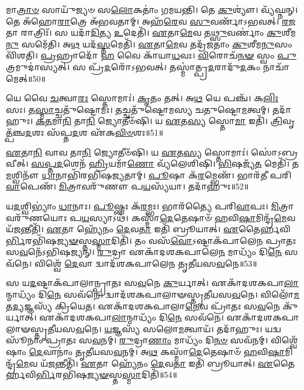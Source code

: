 𑌮𑌾\-\ul{𑌤𑍍𑌰𑌾}\-\-\ul{𑍞} 𑌸𑌾𑌯𑍁᳴𑌜𑍍𑌯𑍞 𑌸\-\ul{𑌲𑍋}\-𑌕𑌤𑌾𑌂॑ 𑌗𑌮𑌯𑌨𑍍𑌤𑌿।
𑌤𑍇 \ul{𑌕𑍁}\-𑌶𑍍𑌯𑍗॑।
𑌵𑍍𑌯᳴𑌘𑍍𑌨𑌨𑍍।
𑌤𑍇 𑌅᳴𑌹𑍋\-\ul{𑌰𑌾}\-𑌤𑍍𑌰𑍇 𑌅᳴𑌭𑌵𑌤𑌾𑌮𑍍।
𑌅𑌹᳴\-\ul{𑌰𑍇}\-𑌵 \ul{𑌸𑍁}\-𑌵𑌰𑍍𑌣𑌾᳴\-𑌽𑌭𑌵𑌤𑍍।
\-\ul{𑌰}\-\-\ul{𑌜}\-𑌤𑌾 𑌰𑌾𑌤𑍍𑌰𑌿𑌃᳴।
𑌸 𑌯𑌦𑌾᳴\-\ul{𑌦𑌿}\-𑌤𑍍𑌯 \ul{𑌉}\-𑌦𑍇𑌤𑌿᳴।
\-\ul{𑌏}\-𑌤𑌾\-\ul{𑌮𑍇}\-𑌵 𑌤\-\ul{𑌥𑍍𑌸𑍁}\-𑌵𑌰𑍍𑌣𑌾𑌂॑ \ul{𑌕𑍁}\-𑌶𑍀𑌮\-\ul{𑌨𑍁} 𑌸𑌮𑍇᳴𑌤𑌿।
𑌅\-\ul{𑌥} 𑌯𑌦᳴\-\ul{𑌸𑍍𑌤}\-𑌮𑍇𑌤𑌿᳴।
\-\ul{𑌏}\-𑌤𑌾\-\ul{𑌮𑍇}\-𑌵 𑌤𑌦𑍍𑌰᳴\-\ul{𑌜}\-𑌤𑌾𑌂 \ul{𑌕𑍁}\-𑌶𑍀𑌮\-\ul{𑌨𑍁}\-𑌸𑌂𑌵𑌿᳴𑌶𑌤𑌿।
\-\ul{𑌪𑍍𑌰}\-𑌹𑍍𑌰𑌾𑌦𑍋᳴ \ul{𑌹} 𑌵𑍈 𑌕𑌾᳴𑌯𑌾\-\ul{𑌧}\-𑌵𑌃।
\-\ul{𑌵𑌿}\-𑌰𑍋𑌚᳴\-\ul{𑌨}\-\-\ul{𑍟} 𑌸𑍍𑌵𑌂 \ul{𑌪𑍁}\-𑌤𑍍𑌰𑌮𑍁𑌦𑌾॑𑌸𑍍𑌯𑌤𑍍।
𑌸 𑌪𑍍𑌰᳴\-\ul{𑌦}\-𑌰𑍋᳴\-𑌽𑌭𑌵𑌤𑍍।
𑌤𑌸𑍍𑌮𑌾॑𑌤𑍍𑌪𑍍𑌰\-\ul{𑌦}\-𑌰𑌾𑌦𑍁᳴\-\ul{𑌦}\-𑌕𑌂 𑌨𑌾𑌚𑌾᳴𑌮𑍇𑌤𑍍॥50॥\anuvakamend[\-\ul{𑌆}\-\-\ul{𑌦𑌿}\-𑌤𑍍𑌯𑌃 𑌪᳴𑌞𑍍𑌚\-\ul{𑌦}\-𑌶\-\ul{𑌸𑍍𑌯} 𑌮𑌾𑌤𑍍𑌰𑌾॑ \ul{𑌸𑍍𑌤𑍁}\-𑌵𑌤𑍇᳴ 𑌪𑌞𑍍𑌚\-\ul{𑌦}\-𑌶𑍇\-\ul{𑌨𑍈}\-𑌵 𑌤𑌦𑍍𑌯𑌜᳴𑌮𑌾\-\ul{𑌨}\-𑌮𑌾𑌦᳴𑌦𑌤𑍇 𑌸𑌪𑍍𑌤\-\ul{𑌦}\-𑌶𑍇\-\ul{𑌨𑍈}\-𑌵 𑌹᳴𑌰𑌨𑍍𑌤𑍍𑌯𑌾\-\ul{𑌦𑌿}\-𑌤𑍍𑌯\-\ul{𑌸𑍍𑌯𑍈}\-𑌵𑍈\-\ul{𑌨𑌂} 𑌤𑌦𑍍𑌵𑌿᳴𑌶𑌤𑌿 \ul{𑌚}\-𑌤𑍍𑌵𑌾𑌰𑌿᳴ 𑌚]

𑌯𑍇 𑌵𑍈 \ul{𑌚}\-𑌤𑍍𑌵𑌾\-\ul{𑌰𑌃} 𑌸𑍍𑌤𑍋𑌮𑌾𑌃॑।
\-\ul{𑌕𑍃}\-𑌤𑌂 𑌤𑌤𑍍।
𑌅\-\ul{𑌥} 𑌯𑍇 𑌪𑌞𑍍𑌚᳴।
𑌕\-\ul{𑌲𑌿𑌃} 𑌸𑌃।
𑌤\-\ul{𑌸𑍍𑌮𑌾}\-𑌚𑍍𑌚𑌤𑍁᳴𑌷𑍍𑌟𑍋𑌮𑌃।
𑌤𑌚𑍍𑌚𑌤𑍁᳴𑌷𑍍𑌟𑍋𑌮𑌸𑍍𑌯 𑌚𑌤𑍁𑌷𑍍𑌟𑍋\-\ul{𑌮}\-𑌤𑍍𑌵𑌮𑍍।
𑌤𑌦𑌾᳴𑌹𑍁𑌃।
\-\ul{𑌕}\-\-\ul{𑌤}\-𑌮𑌾\-\ul{𑌨𑌿} 𑌤𑌾\-\ul{𑌨𑌿} 𑌜𑍍𑌯𑍋𑌤𑍀𑍞᳴𑌷𑌿।
𑌯 \ul{𑌏}\-𑌤\-\ul{𑌸𑍍𑌯} 𑌸𑍍𑌤𑍋\-\ul{𑌮𑌾} 𑌇𑌤𑌿᳴।
\-\ul{𑌤𑍍𑌰𑌿}\-𑌵𑍃𑌤𑍍𑌪᳴𑌞𑍍𑌚\-\ul{𑌦}\-𑌶𑌃 𑌸᳴𑌪𑍍𑌤\-\ul{𑌦}\-𑌶 𑌏᳴𑌕\-\ul{𑌵𑌿}\-\-\ul{𑍞}\-𑌶𑌃॥51॥

\-\ul{𑌏}\-𑌤𑌾\-\ul{𑌨𑌿} 𑌵𑌾𑌵 𑌤𑌾\-\ul{𑌨𑌿} 𑌜𑍍𑌯𑍋𑌤𑍀𑍞᳴𑌷𑌿।
𑌯 \ul{𑌏}\-𑌤\-\ul{𑌸𑍍𑌯} 𑌸𑍍𑌤𑍋𑌮𑌾𑌃॑।
𑌸𑍋॑𑌽𑌬𑍍𑌰𑌵𑍀𑌤𑍍।
\-\ul{𑌸}\-\-\ul{𑌪𑍍𑌤}\-\-\ul{𑌦}\-𑌶𑍇𑌨᳴ \ul{𑌹𑍍𑌰𑌿}\-𑌯𑌮𑌾᳴\-\ul{𑌣𑍋} 𑌵𑍍𑌯᳴𑌲𑍇𑌶𑌿𑌷𑌿।
\-\ul{𑌭𑌿}\-𑌷𑌜𑍍𑌯᳴\-\ul{𑌤} 𑌮𑍇𑌤𑌿᳴।
𑌤\-\ul{𑌮}\-𑌶𑍍𑌵𑌿𑌨𑍗᳴ \ul{𑌧𑌾}\-𑌨𑌾𑌭𑌿᳴𑌰𑌭𑌿𑌷𑌜𑍍𑌯𑌤𑌾𑌮𑍍।
\-\ul{𑌪𑍂}\-𑌷𑌾 𑌕᳴\-\ul{𑌰}\-𑌮𑍍𑌭𑍇𑌣᳴।
𑌭𑌾𑌰᳴𑌤𑍀 𑌪𑌰𑌿\-\ul{𑌵𑌾}\-𑌪𑍇𑌣᳴।
\-\ul{𑌮𑌿}\-𑌤𑍍𑌰𑌾𑌵𑌰𑍁᳴𑌣𑍗 𑌪\-\ul{𑌯}\-𑌸𑍍𑌯᳴𑌯𑌾।
𑌤𑌦𑌾᳴𑌹𑍁𑌃॥52॥

𑌯\-\ul{𑌦}\-𑌶𑍍𑌵𑌿𑌭𑍍𑌯𑌾𑌂॑ \ul{𑌧𑌾}\-𑌨𑌾𑌃।
\-\ul{𑌪𑍂}\-𑌷𑍍𑌣𑌃 𑌕᳴\-\ul{𑌰}\-𑌮𑍍𑌭𑌃।
𑌭𑌾𑌰᳴𑌤𑍍𑌯𑍈 𑌪𑌰𑌿\-\ul{𑌵𑌾}\-𑌪𑌃।
\-\ul{𑌮𑌿}\-𑌤𑍍𑌰𑌾𑌵𑌰𑍁᳴𑌣𑌯𑍋𑌃 𑌪\-\ul{𑌯}\-𑌸𑍍𑌯𑌾𑌽𑌥᳴।
𑌕𑌸𑍍𑌮𑌾᳴\-\ul{𑌦𑍇}\-𑌤𑍇𑌷𑌾𑍞᳴ \ul{𑌹}\-𑌵𑌿\-\ul{𑌷𑌾}\-𑌮𑌿𑌨𑍍𑌦𑍍𑌰᳴\-\ul{𑌮𑍇}\-𑌵 𑌯᳴\-\ul{𑌜}\-𑌨𑍍𑌤𑍀𑌤𑌿᳴।
\-\ul{𑌏}\-𑌤𑌾 𑌹𑍍𑌯𑍇᳴𑌨𑌂 \ul{𑌦𑍇}\-𑌵\-\ul{𑌤𑌾} 𑌇𑌤𑌿᳴ 𑌬𑍍𑌰𑍂𑌯𑌾𑌤𑍍।
\-\ul{𑌏}\-𑌤𑍈𑌰𑍍\mbox{}\-\ul{𑌹}\-𑌵𑌿\-\ul{𑌰𑍍𑌭𑌿}\-\-𑌰𑌭𑌿᳴𑌷\-\ul{𑌜𑍍𑌯}\-\-\ul{𑍟}\-𑌸𑍍𑌤\-\ul{𑌸𑍍𑌮𑌾}\-𑌦𑌿𑌤𑌿᳴।
𑌤𑌂 𑌵𑌸᳴\-\ul{𑌵𑍋}\-\-𑌽𑌷𑍍𑌟𑌾\-𑌕᳴𑌪𑌾𑌲𑍇𑌨 𑌪𑍍𑌰𑌾𑌤𑌃 𑌸\-\ul{𑌵}\-𑌨𑍇᳴\-𑌽𑌭𑌿𑌷𑌜𑍍𑌯𑌨𑍍।
\-\ul{𑌰𑍁}\-𑌦𑍍𑌰𑌾 𑌏𑌕𑌾᳴\-𑌦𑌶\-𑌕𑌪𑌾𑌲𑍇\-\ul{𑌨} 𑌮𑌾𑌧𑍍𑌯𑌂᳴ 𑌦𑌿\-\ul{𑌨𑍇} 𑌸𑌵᳴𑌨𑍇।
𑌵𑌿𑌶𑍍𑌵𑍇᳴ \ul{𑌦𑍇}\-𑌵𑌾 𑌦𑍍𑌵𑌾𑌦᳴𑌶𑌕𑌪𑌾𑌲𑍇𑌨 𑌤𑍃𑌤𑍀𑌯𑌸\-\ul{𑌵}\-𑌨𑍇॥53॥

𑌸 𑌯\-\ul{𑌦}\-𑌷𑍍𑌟𑌾\-𑌕᳴𑌪𑌾𑌲𑌾𑌨𑍍𑌪𑍍𑌰𑌾𑌤𑌃 𑌸\-\ul{𑌵}\-𑌨𑍇 \ul{𑌕𑍁}\-𑌰𑍍𑌯𑌾𑌤𑍍।
𑌏𑌕𑌾᳴𑌦𑌶\-𑌕𑌪𑌾\-\ul{𑌲𑌾}\-𑌨𑍍𑌮𑌾𑌧𑍍𑌯𑌂᳴ 𑌦𑌿\-\ul{𑌨𑍇} 𑌸𑌵᳴𑌨𑍇।
𑌦𑍍𑌵𑌾𑌦᳴𑌶\-𑌕𑌪𑌾𑌲𑌾𑍟𑌸𑍍𑌤𑍃𑌤𑍀𑌯𑌸\-\ul{𑌵}\-𑌨𑍇।
𑌵𑌿𑌲𑍋᳴\-\ul{𑌮} 𑌤\-\ul{𑌦𑍍𑌯}\-𑌜𑍍𑌞𑌸𑍍𑌯᳴ 𑌕𑍍𑌰𑌿𑌯𑍇𑌤।
𑌏𑌕𑌾᳴𑌦𑌶\-𑌕𑌪𑌾𑌲𑌾\-\ul{𑌨𑍇}\-𑌵 𑌪𑍍𑌰𑌾᳴𑌤𑌃 𑌸\-\ul{𑌵}\-𑌨𑍇 𑌕𑍁᳴𑌰𑍍𑌯𑌾𑌤𑍍।
𑌏𑌕𑌾᳴𑌦𑌶\-𑌕𑌪𑌾\-\ul{𑌲𑌾}\-𑌨𑍍𑌮𑌾𑌧𑍍𑌯𑌂᳴ 𑌦𑌿\-\ul{𑌨𑍇} 𑌸𑌵᳴𑌨𑍇।
𑌏𑌕𑌾᳴𑌦𑌶\-𑌕𑌪𑌾𑌲𑌾𑍟\-𑌸𑍍𑌤𑍃𑌤𑍀𑌯𑌸\-\ul{𑌵}\-𑌨𑍇।
\-\ul{𑌯}\-𑌜𑍍𑌞𑌸𑍍𑌯᳴ 𑌸𑌲𑍋\-\ul{𑌮}\-𑌤𑍍𑌵𑌾𑌯᳴।
𑌤𑌦𑌾᳴𑌹𑍁𑌃।
𑌯𑌦𑍍𑌵𑌸𑍂᳴𑌨𑌾𑌂 𑌪𑍍𑌰𑌾𑌤𑌃 𑌸\-\ul{𑌵}\-𑌨𑌮𑍍।
\-\ul{𑌰𑍁}\-𑌦𑍍𑌰𑌾\-\ul{𑌣𑌾𑌂} 𑌮𑌾𑌧𑍍𑌯𑌂᳴ 𑌦𑌿\-\ul{𑌨}\-\-\ul{𑍞} 𑌸𑌵᳴𑌨𑌮𑍍।
𑌵𑌿𑌶𑍍𑌵𑍇᳴𑌷𑌾𑌂 \ul{𑌦𑍇}\-𑌵𑌾𑌨𑌾𑌂॑ 𑌤𑍃𑌤𑍀𑌯𑌸\-\ul{𑌵}\-𑌨𑌮𑍍।
𑌅\-\ul{𑌥} 𑌕𑌸𑍍𑌮𑌾᳴\-\ul{𑌦𑍇}\-𑌤𑍇𑌷𑌾𑍞᳴ \ul{𑌹}\-𑌵𑌿\-\ul{𑌷𑌾}\-𑌮𑌿𑌨𑍍𑌦𑍍𑌰᳴\-\ul{𑌮𑍇}\-𑌵 𑌯᳴\-\ul{𑌜}\-𑌨𑍍𑌤𑍀𑌤𑌿᳴।
\-\ul{𑌏}\-𑌤𑌾 𑌹𑍍𑌯𑍇᳴𑌨𑌂 \ul{𑌦𑍇}\-𑌵\-\ul{𑌤𑌾} 𑌇𑌤𑌿᳴ 𑌬𑍍𑌰𑍂𑌯𑌾𑌤𑍍।
\-\ul{𑌏}\-𑌤𑍈𑌰𑍍\-\mbox{}\-\ul{𑌹}\-𑌵𑌿\-\ul{𑌰𑍍𑌭𑌿}\-𑌰𑌭𑌿᳴\-𑌷\-\ul{𑌜𑍍𑌯}\-\-\ul{𑍟}\-𑌸𑍍𑌤\-\ul{𑌸𑍍𑌮𑌾}\-𑌦𑌿𑌤𑌿᳴॥54॥\anuvakamend[\-\ul{𑌏}\-\-\ul{𑌕}\-\-\ul{𑌵𑌿}\-\-\ul{𑍞}\-𑌶 𑌆᳴𑌹𑍁𑌸𑍍𑌤𑍃𑌤𑍀𑌯𑌸\-\ul{𑌵}\-𑌨𑍇 𑌪𑍍𑌰𑌾᳴𑌤𑌃 𑌸\-\ul{𑌵}\-𑌨𑌂 𑌪𑌞𑍍𑌚᳴ 𑌚]

